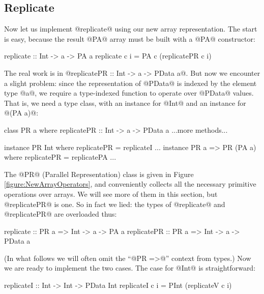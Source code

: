 \subsection{Replicate}
\label{section:Replicate}
Now let us implement @replicate@ using our new array representation.
The start is easy, because the result @PA@ array must be built
with a @PA@ constructor:
\par
\begin{small}
\begin{code}
 replicate :: Int -> a -> PA a
 replicate c i = PA c (replicatePR c i)
\end{code}
\end{small}
\par
\noindent
The real work is in {\small @replicatePR :: Int -> a -> PData a@}.  But now we encounter a slight problem: since the representation of @PData@ is indexed by the element type @a@, we require a type-indexed function to operate over @PData@ values.  That is, we need a type class, with an instance for @Int@ and an instance for @(PA a)@:
\begin{code}
 class PR a where
   replicatePR :: Int -> a -> PData a    
   ...more methods...

 instance PR Int where
   replicatePR = replicateI
   ...
 instance PR a => PR (PA a) where
   replicatePR = replicatePA
   ...
\end{code}
The @PR@ (Parallel Representation) class is given in Figure \ref{figure:NewArrayOperators}, and conveniently collects all the necessary primitive operations over arrays.  We will see more of them in this section, but @replicatePR@ is one. So in fact we lied: the types of @replicate@ and @replicatePR@ are overloaded thus:
\par
\begin{small}
\begin{code}
 replicate   :: PR a => Int -> a -> PA a
 replicatePR :: PR a => Int -> a -> PData a
\end{code}
\end{small}
\par \noindent
(In what follows we will often omit the ``@PR =>@'' context from types.)
Now we are ready to implement the two cases.
The case for @Int@ is straightforward:
\par
\begin{small}
\begin{code}
 replicateI :: Int -> Int -> PData Int
 replicateI c i = PInt (replicateV c i)
\end{code}
\end{small}
